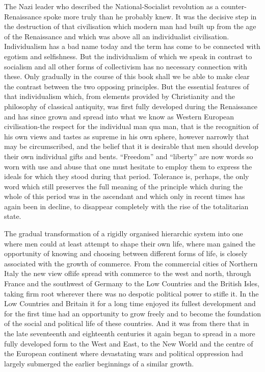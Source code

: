 \documentclass[11pt,openany]{book}
\begin{document}
The Nazi leader who described the National-Socialist revolution as a counter-Renaissance spoke more truly than he probably knew. It was the decisive step in the destruction of that civilisation which modern man had built up from the age of the Renaissance and which was above all an individualist civilisation. Individualism has a bad name today and the term has come to be connected with egotism and selfishness. But the individualism of which we speak in contrast to socialism and all other forms of collectivism has no necessary connection with these. Only gradually in the course of this book shall we be able to make clear the contrast between the two opposing principles. But the essential features of that individualism which, from elements provided by Christianity and the philosophy of classical antiquity, was first fully developed during the Renaissance and has since grown and spread into what we know as Western European civilisation-the respect for the individual man qua man, that is the recognition of his own views and tastes as supreme in his own sphere, however narrowly that may be circumscribed, and the belief that it is desirable that men should develop their own individual gifts and bents. ``Freedom'' and ``liberty'' are now words so worn with use and abuse that one must hesitate to employ them to express the ideals for which they stood during that period. Tolerance is, perhaps, the only word which still preserves the full meaning of the principle which during the whole of this period was in the ascendant and which only in recent times has again been in decline, to disappear completely with the rise of the totalitarian state.

The gradual transformation of a rigidly organised hierarchic system into one where men could at least attempt to shape their own life, where man gained the opportunity of knowing and choosing between different forms of life, is closely associated with the growth of commerce. From the commercial cities of Northern Italy the new view oflife spread with commerce to the west and north, through France and the southwest of Germany to the Low Countries and the British Isles, taking firm root wherever there was no despotic political power to stifle it. In the Low Countries and Britain it for a long time enjoyed its fullest development and for the first time had an opportunity to grow freely and to become the foundation of the social and political life of these countries. And it was from there that in the late seventeenth and eighteenth centuries it again began to spread in a more fully developed form to the West and East, to the New World and the centre of the European continent where devastating wars and political oppression had largely submerged the earlier beginnings of a similar growth.
\end{document}

